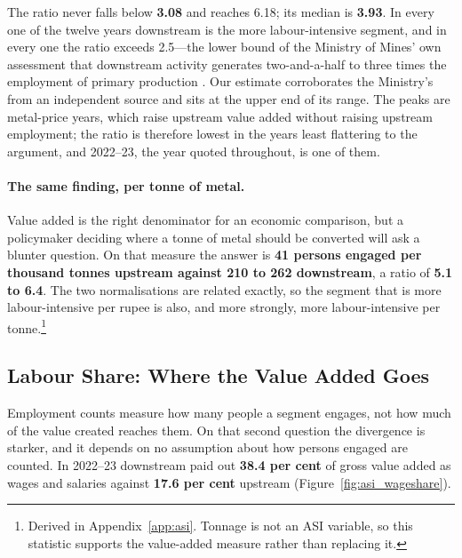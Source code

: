 The ratio never falls below \textbf{3.08} and reaches 6.18; its median is \textbf{3.93}. In every one of the twelve years downstream is the more labour-intensive segment, and in every one the ratio exceeds 2.5---the lower bound of the Ministry of Mines' own assessment that downstream activity generates two-and-a-half to three times the employment of primary production \cite{mom_vision2025}. Our estimate corroborates the Ministry's from an independent source and sits at the upper end of its range. The peaks are metal-price years, which raise upstream value added without raising upstream employment; the ratio is therefore lowest in the years least flattering to the argument, and 2022--23, the year quoted throughout, is one of them.

\paragraph{The same finding, per tonne of metal.} Value added is the right denominator for an economic comparison, but a policymaker deciding where a tonne of metal should be converted will ask a blunter question. On that measure the answer is \textbf{41 persons engaged per thousand tonnes upstream against 210 to 262 downstream}, a ratio of \textbf{5.1 to 6.4}. The two normalisations are related exactly, so the segment that is more labour-intensive per rupee is also, and more strongly, more labour-intensive per tonne.\footnote{Derived in Appendix~\ref{app:asi}. Tonnage is not an ASI variable, so this statistic supports the value-added measure rather than replacing it.}

\subsection{Labour Share: Where the Value Added Goes}

Employment counts measure how many people a segment engages, not how much of the value created reaches them. On that second question the divergence is starker, and it depends on no assumption about how persons engaged are counted. In 2022--23 downstream paid out \textbf{38.4 per cent} of gross value added as wages and salaries against \textbf{17.6 per cent} upstream (Figure~\ref{fig:asi_wageshare}).

